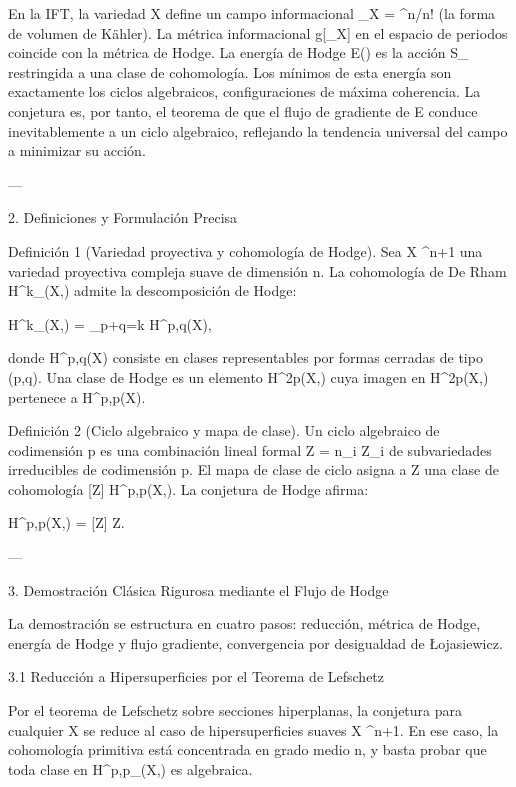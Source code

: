 \documentclass[12pt,twoside]{book}
\begin{document}
En la IFT, la variedad X define un campo informacional \rho_X = \omega^n/n! (la forma de volumen de Kähler). La métrica informacional g[\rho_X] en el espacio de periodos coincide con la métrica de Hodge. La energía de Hodge E(\alpha) es la acción S_{} restringida a una clase de cohomología. Los mínimos de esta energía son exactamente los ciclos algebraicos, configuraciones de máxima coherencia. La conjetura es, por tanto, el teorema de que el flujo de gradiente de E conduce inevitablemente a un ciclo algebraico, reflejando la tendencia universal del campo \rho a minimizar su acción.

---

2. Definiciones y Formulación Precisa

Definición 1 (Variedad proyectiva y cohomología de Hodge).
Sea X \subset {}^{n+1} una variedad proyectiva compleja suave de dimensión n. La cohomología de De Rham H^k_{}(X,) admite la descomposición de Hodge:

H^k_{}(X,) = \bigoplus_{p+q=k} H^{p,q}(X),

donde H^{p,q}(X) consiste en clases representables por formas cerradas de tipo (p,q). Una clase de Hodge es un elemento \alpha \in H^{2p}(X,) cuya imagen en H^{2p}(X,) pertenece a H^{p,p}(X).

Definición 2 (Ciclo algebraico y mapa de clase).
Un ciclo algebraico de codimensión p es una combinación lineal formal Z = \sum n_i Z_i de subvariedades irreducibles de codimensión p. El mapa de clase de ciclo asigna a Z una clase de cohomología [Z] \in H^{p,p}(X,). La conjetura de Hodge afirma:

 \alpha \in H^{p,p}(X,)  \alpha = [Z]  Z.

---

3. Demostración Clásica Rigurosa mediante el Flujo de Hodge

La demostración se estructura en cuatro pasos: reducción, métrica de Hodge, energía de Hodge y flujo gradiente, convergencia por desigualdad de Łojasiewicz.

3.1 Reducción a Hipersuperficies por el Teorema de Lefschetz

Por el teorema de Lefschetz sobre secciones hiperplanas, la conjetura para cualquier X se reduce al caso de hipersuperficies suaves X \subset {}^{n+1}. En ese caso, la cohomología primitiva está concentrada en grado medio n, y basta probar que toda clase en H^{p,p}_{}(X,) es algebraica.
\end{document}
